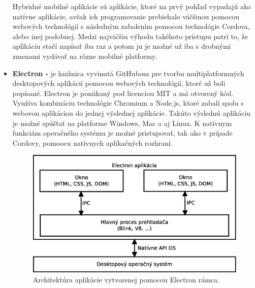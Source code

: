 \begin{itemize}
    Hybridné mobilné aplikácie sú aplikácie, ktoré na prvý pohľad vypadajú ako natívne aplikácie, avšak ich programovanie prebiehalo väčšinou pomocou webových technológií s následným zabalením pomocou technológie Cordova, alebo inej podobnej. Medzi  najväčšiu výhodu takéhoto prístupu patrí to, že aplikáciu stačí napísať iba raz a potom ju je možné už iba s drobnými zmenami vydávať na rôzne mobilné platformy.\cite{0QSW9GoG0OTJ7FKM}
    \item \textbf{Electron -} je knižnica vyvinutá GitHubom pre tvorbu multiplatformných desktopových aplikácií pomocou webových technológií, ktoré už boli popísané. Electron je ponúkaný pod licenciou MIT a má otvorený kód. Využíva kombináciu technológie Chromium a Node.js, ktoré zabalí spolu s webovou aplikáciou do jednej výslednej aplikácie. Takúto výslednú aplikáciu je možné spúšťať na platforme Windows, Mac a aj Linux. K natívnym funkciám operačného systému je možné pristupovať, tak ako v prípade Cordovy, pomoocu natívnych aplikačných rozhraní. \cite{hBGbGXxiU66nJt51}
    \begin{figure}[h]
      \centering
      \includegraphics[scale=0.40]{fig/electron.eps}
      \caption{Architektúra aplikácie vytvorenej pomocou Electron rámca.}
      \label{fig:electron}
    \end{figure}
\end{itemize}

